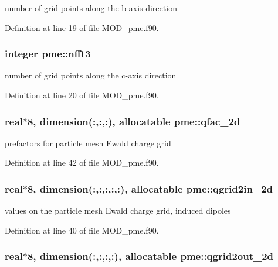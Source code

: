 number of grid points along the b-\/axis direction 



Definition at line 19 of file M\-O\-D\-\_\-pme.\-f90.

\hypertarget{classpme_a8c9bd1d93a04978d16457ee89f7251e8}{
\subsubsection[{nfft3}]{\setlength{\rightskip}{0pt plus 5cm}integer pme\-::nfft3}}\label{classpme_a8c9bd1d93a04978d16457ee89f7251e8}


number of grid points along the c-\/axis direction 



Definition at line 20 of file M\-O\-D\-\_\-pme.\-f90.

\hypertarget{classpme_a91c3f31f171829c8b5e2ad267040b047}{
\subsubsection[{qfac\-\_\-2d}]{\setlength{\rightskip}{0pt plus 5cm}real$\ast$8, dimension(\-:,\-:,\-:), allocatable pme\-::qfac\-\_\-2d}}\label{classpme_a91c3f31f171829c8b5e2ad267040b047}


prefactors for particle mesh Ewald charge grid 



Definition at line 42 of file M\-O\-D\-\_\-pme.\-f90.

\hypertarget{classpme_a12be952cd0b3e3fddb1e38a9272c2898}{
\subsubsection[{qgrid2in\-\_\-2d}]{\setlength{\rightskip}{0pt plus 5cm}real$\ast$8, dimension(\-:,\-:,\-:,\-:,\-:), allocatable pme\-::qgrid2in\-\_\-2d}}\label{classpme_a12be952cd0b3e3fddb1e38a9272c2898}


values on the particle mesh Ewald charge grid, induced dipoles 



Definition at line 40 of file M\-O\-D\-\_\-pme.\-f90.

\hypertarget{classpme_a41e685e4c0f36238cb3abf670331f0c6}{
\subsubsection[{qgrid2out\-\_\-2d}]{\setlength{\rightskip}{0pt plus 5cm}real$\ast$8, dimension(\-:,\-:,\-:,\-:), allocatable pme\-::qgrid2out\-\_\-2d}}\label{classpme_a41e685e4c0f36238cb3abf670331f0c6}


